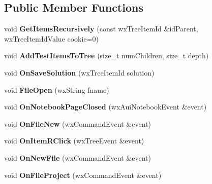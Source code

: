 \subsection*{Public Member Functions}
\begin{DoxyCompactItemize}
\item 
\hypertarget{class_my_frame_adb0ef0657ae6da07cfc9b5cb97bf830e}{void {\bfseries Get\+Items\+Recursively} (const wx\+Tree\+Item\+Id \&id\+Parent, wx\+Tree\+Item\+Id\+Value cookie=0)}\label{class_my_frame_adb0ef0657ae6da07cfc9b5cb97bf830e}

\item 
\hypertarget{class_my_frame_ae61088e3c39f47de93cfee6a431ff8c7}{void {\bfseries Add\+Test\+Items\+To\+Tree} (size\+\_\+t num\+Children, size\+\_\+t depth)}\label{class_my_frame_ae61088e3c39f47de93cfee6a431ff8c7}

\item 
\hypertarget{class_my_frame_ae914b83cd080c0fbf45998c14cf66b40}{void {\bfseries On\+Save\+Solution} (wx\+Tree\+Item\+Id solution)}\label{class_my_frame_ae914b83cd080c0fbf45998c14cf66b40}

\item 
\hypertarget{class_my_frame_a9562ec6151b8c4286f389dd482bb1e57}{void {\bfseries File\+Open} (wx\+String fname)}\label{class_my_frame_a9562ec6151b8c4286f389dd482bb1e57}

\item 
\hypertarget{class_my_frame_a2e7388f928078b7451d2a8456beb8fd1}{void {\bfseries On\+Notebook\+Page\+Closed} (wx\+Aui\+Notebook\+Event \&event)}\label{class_my_frame_a2e7388f928078b7451d2a8456beb8fd1}

\item 
\hypertarget{class_my_frame_a0f2ce68a3e90bd2f69b4180530c10744}{void {\bfseries On\+File\+New} (wx\+Command\+Event \&event)}\label{class_my_frame_a0f2ce68a3e90bd2f69b4180530c10744}

\item 
\hypertarget{class_my_frame_a5293d0ca07360b7cdc8cdde42634b6de}{void {\bfseries On\+Item\+R\+Click} (wx\+Tree\+Event \&event)}\label{class_my_frame_a5293d0ca07360b7cdc8cdde42634b6de}

\item 
\hypertarget{class_my_frame_a1cbcc149bf0319a52311e5fbf66ae4d4}{void {\bfseries On\+New\+File} (wx\+Command\+Event \&event)}\label{class_my_frame_a1cbcc149bf0319a52311e5fbf66ae4d4}

\item 
\hypertarget{class_my_frame_a4c5effeba4519bd2d8b2a19000beb5b2}{void {\bfseries On\+File\+Project} (wx\+Command\+Event \&event)}\label{class_my_frame_a4c5effeba4519bd2d8b2a19000beb5b2}


\end{DoxyCompactItemize}

